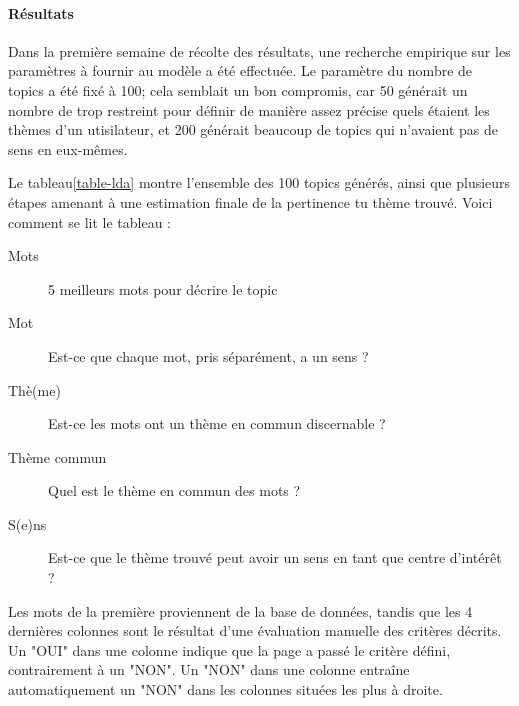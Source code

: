 			\paragraph{Résultats}

				Dans la première semaine de récolte des résultats, une recherche empirique sur les paramètres à fournir au modèle a été effectuée. Le paramètre du nombre de topics a été fixé à 100; cela semblait un bon compromis, car 50 générait un nombre de trop restreint pour définir de manière assez précise quels étaient les thèmes d'un utisilateur, et 200 générait beaucoup de topics qui n'avaient pas de sens en eux-mêmes.

				Le tableau\ref{table-lda} montre l'ensemble des 100 topics générés, ainsi que plusieurs étapes amenant à une estimation finale de la pertinence tu thème trouvé. Voici comment se lit le tableau :
				\begin{description}
					\item[Mots] 5 meilleurs mots pour décrire le topic
					\item[Mot] Est-ce que chaque mot, pris séparément, a un sens ?
					\item[Thè(me)] Est-ce les mots ont un thème en commun discernable ?
					\item[Thème commun] Quel est le thème en commun des mots ?
					\item[S(e)ns] Est-ce que le thème trouvé peut avoir un sens en tant que centre d'intérêt ?
				\end{description}

				Les mots de la première proviennent de la base de données, tandis que les 4 dernières colonnes sont le résultat d'une évaluation manuelle des critères décrits. Un "OUI" dans une colonne indique que la page a passé le critère défini, contrairement à un "NON". Un "NON" dans une colonne entraîne automatiquement un "NON" dans les colonnes situées les plus à droite.

